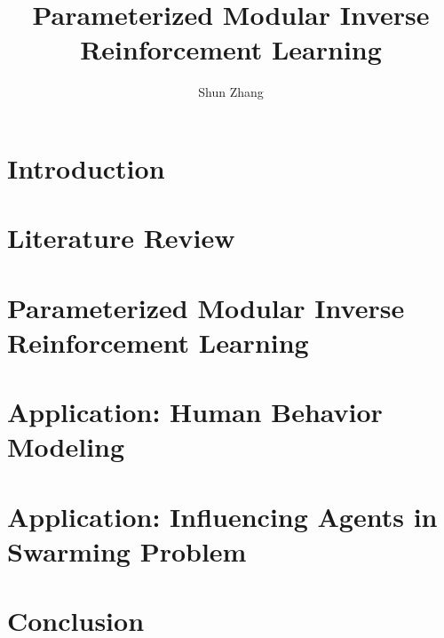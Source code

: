 \documentclass[10pt]{book}
\title{Parameterized Modular Inverse Reinforcement Learning}
\author{Shun Zhang}
\date{}
\begin{document}
\maketitle

\chapter{Introduction}

\chapter{Literature Review}


\chapter{Parameterized Modular Inverse Reinforcement Learning}



\chapter{Application: Human Behavior Modeling}


\chapter{Application: Influencing Agents in Swarming Problem}


\chapter{Conclusion}



\end{document}
